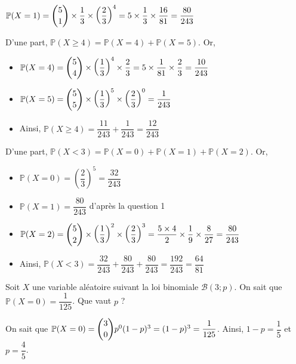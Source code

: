 \documentclass[11pt,fleqn, openany]{book} %
\begin{document}
\begin{solution}$\mathbb{P}(X=1)=\dbinom{5}{1} \times \dfrac{1}{3} \times \left(\dfrac{2}{3}\right)^4=5\times \dfrac{1}{3} \times \dfrac{16}{81}=\dfrac{80}{243}$

D'une part, $\mathbb{P}(X \geqslant 4)=\mathbb{P}(X=4) + \mathbb{P}(X=5)$. Or,
\begin{itemize}
\item $\mathbb{P}(X=4)=\dbinom{5}{4} \times \left(\dfrac{1}{3}\right)^4 \times \dfrac{2}{3}=5 \times \dfrac{1}{81} \times \dfrac{2}{3}=\dfrac{10}{243}$
\item $\mathbb{P}(X=5)=\dbinom{5}{5} \times \left( \dfrac{1}{3}\right)^5 \times \left(\dfrac{2}{3}\right)^0 = \dfrac{1}{243}$
\item Ainsi, $\mathbb{P}(X \geqslant 4)= \dfrac{11}{243}+\dfrac{1}{243}=\dfrac{12}{243}$
\end{itemize}

D'une part, $\mathbb{P}(X<3)=\mathbb{P}(X=0)+\mathbb{P}(X=1)+\mathbb{P}(X=2)$. Or,
\begin{itemize}
\item $\mathbb{P}(X=0)= \left(\dfrac{2}{3}\right)^5=\dfrac{32}{243}$
\item $\mathbb{P}(X=1)= \dfrac{80}{243}$ d'après la question 1
\item $\mathbb{P}(X=2)= \dbinom{5}{2} \times \left( \dfrac{1}{3}\right)^2 \times \left( \dfrac{2}{3} \right)^3 = \dfrac{5 \times 4}{2} \times \dfrac{1}{9} \times \dfrac{8}{27}=\dfrac{80}{243}$
\item Ainsi, $\mathbb{P}(X<3)=\dfrac{32}{243}+\dfrac{80}{243}+\dfrac{80}{243}=\dfrac{192}{243}=\dfrac{64}{81}$
\end{itemize}
\end{solution} 



\begin{exercise}[subtitle={(Amérique du Nord 2023)}]Soit $X$ une variable aléatoire suivant la loi binomiale $\mathcal{B}(3;p)$. On sait que $\mathbb{P}(X=0)=\dfrac{1}{125}$. Que vaut $p$ ?\end{exercise}

\begin{solution}On sait que $\mathbb{P}(X=0)=\dbinom{3}{0}p^0(1-p)^3=(1-p)^3=\dfrac{1}{125}$. Ainsi, $1-p=\dfrac{1}{5}$ et $p=\dfrac{4}{5}$.\end{solution}
\end{document}
